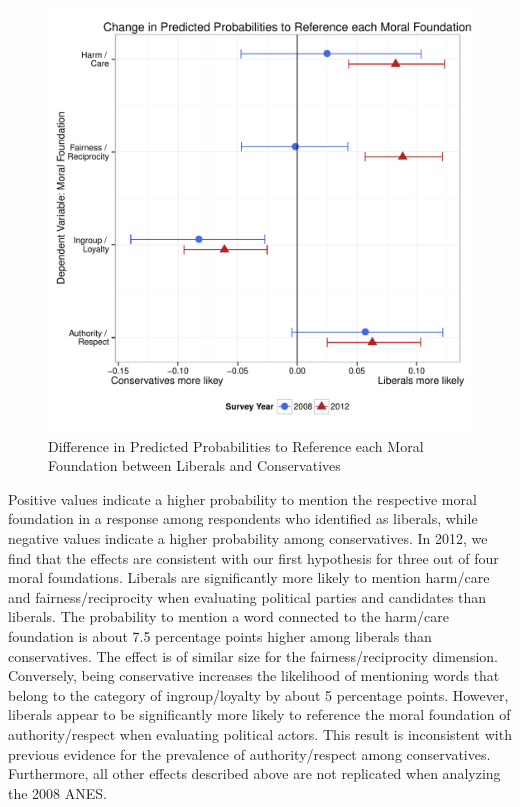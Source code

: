 \documentclass[12pt]{article}
\begin{document}
\begin{figure}\centering
\includegraphics[scale=.6]{../calc/fig/m1_mft.pdf}
\caption{Difference in Predicted Probabilities to Reference each Moral Foundation between Liberals and Conservatives}\label{fig:m1_mft}
\end{figure}

Positive values indicate a higher probability to mention the respective moral foundation in a response among respondents who identified as liberals, while negative values indicate a higher probability among conservatives. In 2012, we find that the effects are consistent with our first hypothesis for three out of four moral foundations. Liberals are significantly more likely to mention harm/care and fairness/reciprocity when evaluating political parties and candidates than liberals. The probability to mention a word connected to the harm/care foundation is about 7.5 percentage points higher among liberals than conservatives. The effect is of similar size for the fairness/reciprocity dimension. Conversely, being conservative increases the likelihood of mentioning words that belong to the category of ingroup/loyalty by about 5 percentage points. However, liberals appear to be significantly more likely to reference the moral foundation of authority/respect when evaluating political actors. This result is inconsistent with previous evidence for the prevalence of authority/respect among conservatives. Furthermore, all other effects described above are not replicated when analyzing the 2008 ANES.
\end{document}
